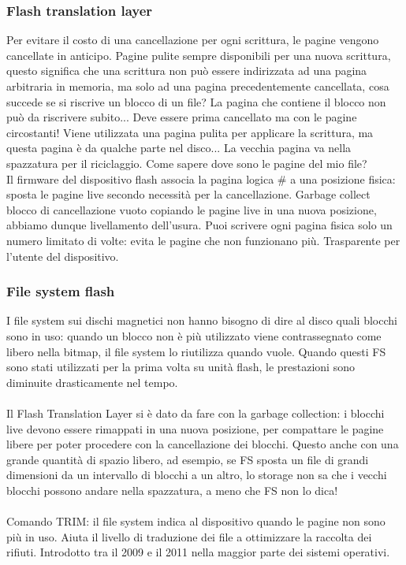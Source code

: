 \subsubsection{Flash translation layer}
Per evitare il costo di una cancellazione per ogni scrittura, le pagine vengono cancellate in anticipo. Pagine pulite sempre disponibili per una nuova scrittura, questo significa che una scrittura non può essere indirizzata ad una pagina arbitraria in memoria, ma solo ad una pagina precedentemente cancellata, cosa succede se si riscrive un blocco di un file? La pagina che contiene il blocco non può da riscrivere subito...
Deve essere prima cancellato ma con le pagine circostanti!
Viene utilizzata una pagina pulita per applicare la scrittura, ma questa pagina è da qualche parte nel disco...
La vecchia pagina va nella spazzatura per il riciclaggio. Come sapere dove sono le pagine del mio file?\\
Il firmware del dispositivo flash associa la pagina logica \# a una posizione fisica: sposta le pagine live 
secondo necessità per la cancellazione. Garbage collect blocco di cancellazione vuoto copiando le pagine 
live in una nuova posizione, abbiamo dunque livellamento dell'usura. 
Puoi scrivere ogni pagina fisica solo un numero limitato di volte: evita le pagine che non funzionano più. 
Trasparente per l'utente del dispositivo.

\subsubsection{File system flash}
I file system sui dischi magnetici non hanno bisogno di dire al disco quali blocchi sono in uso: 
quando un blocco non è più utilizzato viene contrassegnato come libero nella bitmap, il file system 
lo riutilizza quando vuole. Quando questi FS sono stati utilizzati per la prima volta su unità flash, 
le prestazioni sono diminuite drasticamente nel tempo.\\\\
Il Flash Translation Layer si è dato da fare con la garbage collection: i blocchi live devono essere 
rimappati in una nuova posizione, per compattare le pagine libere per poter procedere con la cancellazione dei blocchi. 
Questo anche con una grande quantità di spazio libero, ad esempio, se FS sposta un file di grandi dimensioni da un 
intervallo di blocchi a un altro, lo storage non sa che i vecchi blocchi possono andare nella spazzatura, a meno che FS 
non lo dica!\\\\
Comando TRIM: il file system indica al dispositivo quando le pagine non sono più in uso. Aiuta il livello di traduzione dei file a ottimizzare la raccolta dei rifiuti. Introdotto tra il 2009 e il 2011 nella maggior parte dei sistemi operativi.


